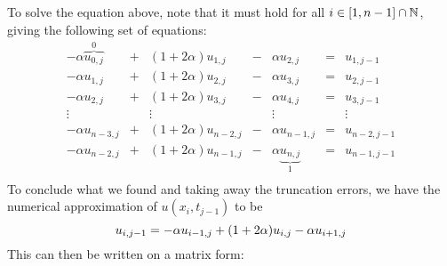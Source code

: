 \documentclass[12pt,english,a4paper]{article}
\begin{document}
To solve the equation above, note that it must hold for all \(i\in\qty[1,n-1]\cap\mathbb{N}\), giving the following set of equations:
\[
    \begin{array}{ccccccc}
        -\alpha \overbrace{u_{0,j}}^0 &+& (1+2\alpha)u_{1,j} &-& \alpha u_{2,j} &=& u_{1,j-1}\\
        -\alpha u_{1,j} &+& (1+2\alpha)u_{2,j} &-& \alpha u_{3,j} &=& u_{2,j-1}\\
        -\alpha u_{2,j} &+& (1+2\alpha)u_{3,j} &-& \alpha u_{4,j} &=& u_{3,j-1}\\
        \vdots && \vdots && \vdots && \vdots\\
        -\alpha u_{n-3,j} &+& (1+2\alpha)u_{n-2,j} &-& \alpha u_{n-1,j} &=& u_{n-2,j-1}\\
        -\alpha u_{n-2,j} &+& (1+2\alpha)u_{n-1,j} &-& \alpha \underbrace{u_{n,j}}_1 &=& u_{n-1,j-1}\\
    \end{array}
\]
To conclude what we found and taking away the truncation errors, we have the numerical approximation of \(u(x_i,t_{j-1})\) to be
\begin{equation}\label{eq:backwardEuler}
u_{i,j-1} = -\alpha u_{i-1,j} + \qty(1+2\alpha)u_{i,j} - \alpha u_{i+1,j}
\end{equation}
This can then be written on a matrix form:
\end{document}
